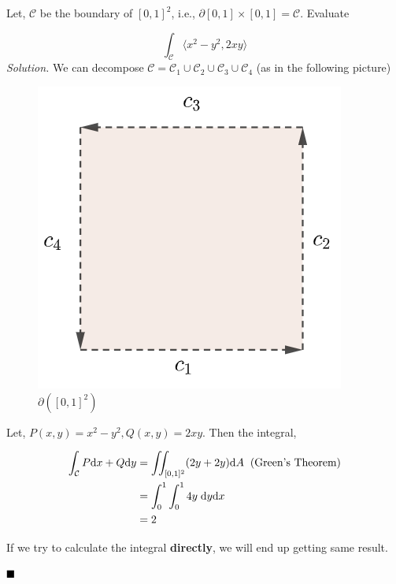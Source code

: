 \documentclass[../Analysis-3]{subfiles}
\begin{document}
\begin{Eg}{}{}
    Let, $\mathcal{C}$ be the boundary of $[0,1]^2$, i.e., $\partial [0,1]\times[0,1] = \mathcal{C}$. Evaluate

    \[\int_{\mathcal{C}} \langle x^2-y^2,2xy \rangle\]
    \textit{Solution.} We can decompose $\mathcal{C} = \mathcal{C}_1 \cup \mathcal{C}_2 \cup \mathcal{C}_3 \cup \mathcal{C}_4$ (as in the following picture)

    \begin{figure}
        \centering
        \includegraphics[width=.78\linewidth]{../figures/lec-28.2.png}
        \caption{$\partial( [0,1]^2)$}
    \end{figure}

    Let, $P(x,y) = x^2 - y^2, Q(x,y) = 2xy$. Then the integral,

    \begin{align*}
        \int_{\mathcal{C}} P \dd x + Q \dd y & = \iint_{[0,1]^2} (2y + 2y) \dd A \hspace{0.2cm} \text{(Green's Theorem)} \\
                                             & = \int_{0}^1 \int_0^1 4y \hspace{0.1cm} \dd y \dd x                       \\
                                             & = 2
    \end{align*}

    If we try to calculate the integral \textbf{directly}, we will end up getting same result.

    $\hfill \blacksquare$
\end{Eg}
\end{document}
